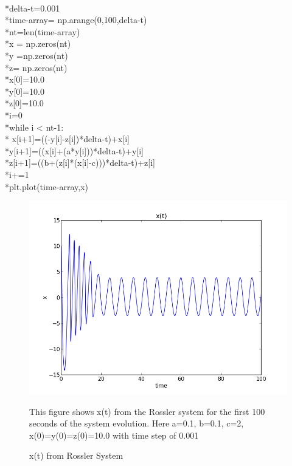 \documentclass[letterpaper,12pt]{article}
\begin{document}
\\*delta-t=0.001
\\*time-array= np.arange(0,100,delta-t)
\\*nt=len(time-array)
\\*x = np.zeros(nt)
\\*y =np.zeros(nt)
\\*z= np.zeros(nt)
\\*x[0]=10.0
\\*y[0]=10.0
\\*z[0]=10.0
\\*i=0
\\*while i < nt-1:
   \\* x[i+1]=((-y[i]-z[i])*delta-t)+x[i]
    \\*y[i+1]=((x[i]+(a*y[i]))*delta-t)+y[i]
    \\*z[i+1]=((b+(z[i]*(x[i]-c)))*delta-t)+z[i]
    \\*i+=1
\\*plt.plot(time-array,x)


\FloatBarrier
\begin{figure}[h!]
\centering
\includegraphics[scale=0.6]{1_a.png}
\caption{x(t) from Rossler System}
This figure shows x(t) from the Rossler system for the first 100 seconds of the system evolution. Here a=0.1, b=0.1, c=2, x(0)=y(0)=z(0)=10.0 with time step of 0.001
\end{figure}
\FloatBarrier

\end{document}
